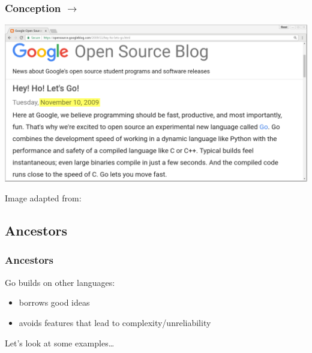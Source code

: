 \begin{frame}[t]
  \frametitle{Conception $\rightarrow$ }

  \vspace{-0.4\baselineskip}
  \begin{center}
    \includegraphics[width=0.9\linewidth]{announcement}
  \end{center}

  \vspace{-0.4\baselineskip}
  \fullvfill
  \hfill
  \begin{minipage}{\linewidth}
    \raggedright
    \tiny
    Image adapted from:
  \end{minipage}

\end{frame}

\subsection{Ancestors}

\begin{frame}[t]
  \frametitle{Ancestors}

  Go builds on other languages:
  \begin{itemize}
  \item borrows good ideas
  \item avoids features that lead to complexity/unreliability
  \end{itemize}

  \vspace{\baselineskip}
  Let's look at some examples\dots

\end{frame}

